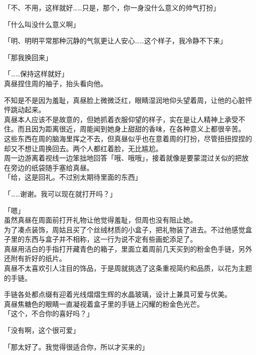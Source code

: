 「不、不用，这样就好……只是，那个，你一身没什么意义的帅气打扮」

「什么叫没什么意义啊」

「明、明明平常那种沉静的气氛更让人安心……这个样子，我冷静不下来」

「那我换回来」

「……保持这样就好」\\

真昼捏住周的袖子，抬头看向他。

不知是不是因为羞耻，真昼脸上微微泛红，眼睛湿润地仰头望着周，让他的心脏怦怦跳动起来。\\

真昼本人应该不是故意的，但她抓着衣服仰望的样子，实在是让人精神上承受不住。而且因为距离很近，周能闻到她身上甜甜的香味，在各种意义上都很辛苦。\\

这些东西在周的脑海里挥之不去，但真昼似乎也在意着周的打扮，尽管扭扭捏捏的却又不想让周换回去。两个人都红着脸，无比尴尬。\\

周一边游离着视线一边笨拙地回答「哦、哦哦」，接着就像是要蒙混过关似的把放在旁边的纸袋随手塞给真昼。\\

「给，这是回礼。不过别太期待里面的东西」

「……谢谢。我可以现在就打开吗？」

「嗯」\\

虽然真昼在周面前打开礼物让他觉得羞耻，但周也没有阻止她。\\

为了凑点装饰，周姑且买了个丝绒材质的小盒子，把礼物装了进去。不过他感觉盒子里的东西与盒子并不相称，这一行为说不定有些画蛇添足了。\\

真昼用洁白的手指打开藏青色的箱子，里面立着周前几天买到的粉金色手链，另外还附有折好的纸片。\\

真昼不太喜欢引人注目的饰品，于是周就挑选了这条重视简约和品质，以花为主题的手链。

手链各处都点缀有迎着光线熠熠生辉的水晶玻璃，设计上兼具可爱与优美。\\

真昼焦糖色的眼睛一直凝视着盒子里的手链上闪耀的粉金色光芒。\\

「这个，不合你的喜好吗？」

「没有啊，这个很可爱」

「那太好了。我觉得很适合你，所以才买来的」

